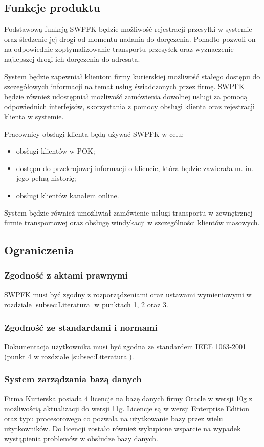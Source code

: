 \subsection{Funkcje produktu}
Podstawową funkcją SWPFK będzie możliwość rejestracji przesyłki w systemie oraz śledzenie jej drogi od momentu nadania do doręczenia. Ponadto pozwoli on na odpowiednie zoptymalizowanie transportu przesyłek oraz wyznaczenie najlepszej drogi ich doręczenia do adresata.

System będzie zapewniał klientom firmy kurierskiej możliwość stałego dostępu do szczegółowych informacji na temat usług świadczonych przez firmę. SWPFK będzie również udostępniał możliwość zamówienia dowolnej usługi za pomocą odpowiednich interfejsów, skorzystania z pomocy obsługi klienta oraz rejestracji klienta w systemie.

Pracownicy obsługi klienta będą używać SWPFK w celu:
\begin{itemize}
\item obsługi klientów w POK;
\item dostępu do przekrojowej informacji o kliencie, która będzie zawierała m. in. jego pełną historię;
\item obsługi klientów kanałem online.
\end{itemize}

System będzie również umożliwiał zamówienie usługi transportu w zewnętrznej firmie transportowej oraz obsługę windykacji w szczególności klientów masowych.

\subsection{Ograniczenia}

\subsubsection{Zgodność z aktami prawnymi}
SWPFK musi być zgodny z rozporządzeniami oraz ustawami wymieniowymi w rozdziale \ref{subsec:Literatura} w punktach 1, 2 oraz 3.

\subsubsection{Zgodność ze standardami i normami}
Dokumentacja użytkownika musi być zgodna ze standardem IEEE 1063-2001 (punkt 4 w rozdziale \ref{subsec:Literatura}).

\subsubsection{System zarządzania bazą danych}
Firma Kurierska posiada 4 licencje na bazę danych firmy Oracle w wersji 10g z możliwością aktualizacji do wersji 11g. Licencje są w wersji Enterprise Edition oraz typu procesorowego co pozwala na użytkowanie bazy przez wielu użytkowników. Do licencji zostało również wykupione wsparcie na wypadek wystąpienia problemów w obsłudze bazy danych.


